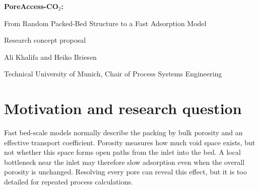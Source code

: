 \documentclass[10pt,a4paper]{article}
\begin{document}
\begin{center}
{\Large\bfseries\color{titleblue}PoreAccess-CO$_2$:\par
From Random Packed-Bed Structure to a Fast Adsorption Model\par}
\vspace{0.55em}
{\normalsize Research concept proposal\par}
\vspace{0.2em}
{\small Ali Khalifa and Heiko Briesen\par
Technical University of Munich, Chair of Process Systems Engineering\par}
\end{center}
\vspace{0.25em}

\begin{abstract}
Packed beds are used for CO$_2$ adsorption, gas purification and drying. Even
when two beds contain the same particles and have nearly the same porosity,
their void pathways can differ. These differences may control how easily gas
enters the bed and reaches the adsorbent, but they are hidden in conventional
one-dimensional models. This project will connect three model levels. DEM will
generate mechanically realistic zeolite beds. A pore-network model will resolve
diffusion and adsorption in each void structure. A simple homogeneous model
will then reproduce each uptake curve using one fitted effective diffusivity.
The central test is whether a physically defined inlet-accessibility descriptor
can predict this diffusivity for a new packing. The expected outcome is an
interpretable structure-to-model closure: particle geometry in, fast transient
adsorption prediction out. The study deliberately isolates diffusion-driven
adsorption; no CFD or imposed gas flow is required in the first step.
\end{abstract}

\section{Motivation and research question}
Fast bed-scale models normally describe the packing by bulk porosity and an
effective transport coefficient. Porosity measures how much void space exists,
but not whether this space forms open paths from the inlet into the bed. A local
bottleneck near the inlet may therefore slow adsorption even when the overall
porosity is unchanged. Resolving every pore can reveal this effect, but it is
too detailed for repeated process calculations.
\end{document}

